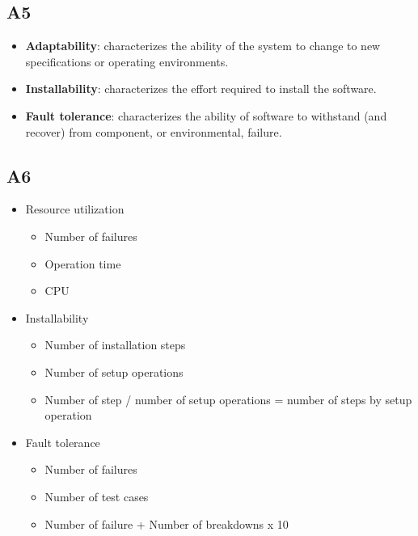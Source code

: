 \subsection*{A5}
    \begin{itemize}
        \item \textbf{Adaptability}: characterizes the ability of the system to change to new specifications or operating environments.
        \item \textbf{Installability}: characterizes the effort required to install the software.
        \item \textbf{Fault tolerance}: characterizes the ability of software to withstand (and recover) from component, or environmental, failure.
    \end{itemize}

\subsection*{A6}
    \begin{itemize}
        \item Resource utilization
            \begin{itemize}
                \item Number of failures
                \item Operation time
                \item CPU
            \end{itemize}
        \item Installability
            \begin{itemize}
                \item Number of installation steps
                \item Number of setup operations
                \item Number of step / number of setup operations = number of steps by setup operation
            \end{itemize}
        \item Fault tolerance
            \begin{itemize}
                \item Number of failures
                \item Number of test cases
                \item Number of failure + Number of breakdowns x 10
            \end{itemize}
    \end{itemize}


